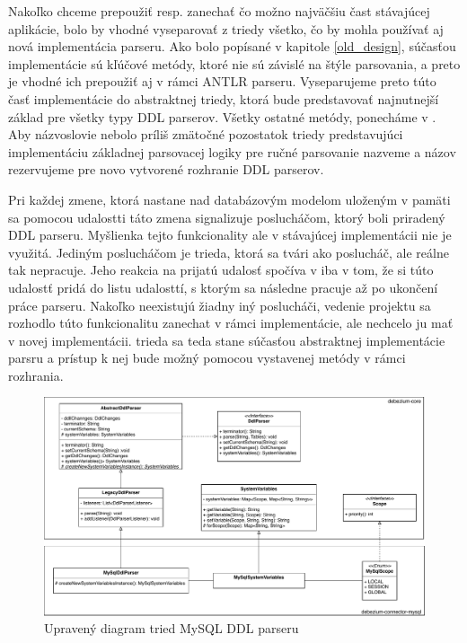 Nakoľko chceme prepoužiť resp. zanechať čo možno najväčšiu čast stávajúcej aplikácie, bolo by vhodné vyseparovať z triedy  všetko, čo by mohla používať aj nová implementácia parseru. Ako bolo popísané v kapitole \ref{old_design}, súčasťou implementácie  sú kľúčové metódy, ktoré nie sú závislé na štýle parsovania, a preto je vhodné ich prepoužiť aj v rámci ANTLR parseru. Vyseparujeme preto túto časť implementácie do abstraktnej triedy, ktorá bude predstavovať najnutnejší základ pre všetky typy DDL parserov. Všetky ostatné metódy, ponecháme v . Aby názvoslovie nebolo príliš zmätočné pozostatok triedy  predstavujúci implementáciu základnej parsovacej logiky pre ručné parsovanie nazveme  a názov  rezervujeme pre novo vytvorené rozhranie DDL parserov.

Pri každej zmene, ktorá nastane nad databázovým modelom uloženým v pamäti sa pomocou udalostti táto zmena signalizuje poslucháčom, ktorý boli priradený DDL parseru. Myšlienka tejto funkcionality ale v stávajúcej implementácii nie je využitá. Jediným poslucháčom je  trieda, ktorá sa tvári ako poslucháč, ale reálne tak nepracuje. Jeho reakcia na prijatú udalosť spočíva v iba v tom, že si túto udalostť pridá do listu udalosttí, s ktorým sa následne pracuje až po ukončení práce parseru. Nakoľko neexistujú žiadny iný poslucháči, vedenie projektu sa rozhodlo túto funkcionalitu zanechat v rámci  implementácie, ale nechcelo ju mať v novej implementácii.  trieda sa teda stane súčasťou abstraktnej implementácie parsru a prístup k nej bude možný pomocou vystavenej metódy v rámci  rozhrania.

\begin{figure}[H]
\begin{center}
\includegraphics[width=15cm]{figures/New_design.pdf}
\caption{Upravený diagram tried MySQL DDL parseru}
\label{fig:class_diagram_new}
\end{center}
\end{figure}


